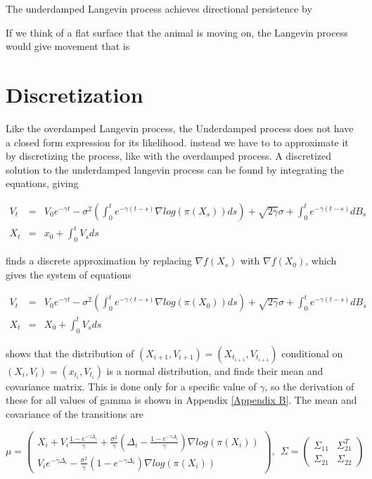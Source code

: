 The underdamped Langevin process achieves directional persistence by 

If we think of a flat surface that the animal is moving on, the Langevin process would give movement that is 


\section{Discretization}

Like the overdamped Langevin process, the Underdamped process does not have a closed form expression for its likelihood. instead we have to to approximate it by discretizing the process, like with the overdamped process. A discretized solution to the underdamped langevin process can be found by integrating the equations, giving


$$
\begin{array}{lcl} V_t & = & V_0 e^{-\gamma t}-\sigma^2(\int_0^{t} e^{-\gamma(t-s)}\nabla log(\pi(X_s))ds) + \sqrt{2\gamma}\sigma + \int_0^{t} e^{-\gamma(t-s)} dB_s \\
X_t & = & x_0 + \int_0^{t} V_s ds \end{array}
$$


\cite{cheng_underdamped_nodate} finds a discrete approximation by replacing $\nabla f(X_s)$ with $\nabla f(X_0)$, which gives the system of equations

$$
\begin{array}{lcl} V_t & = & V_0 e^{-\gamma t}-\sigma^2(\int_0^t e^{-\gamma(t-s)}\nabla log(\pi(X_0))ds) + \sqrt{2\gamma}\sigma + \int_0^t e^{-\gamma(t-s)} dB_s \\
X_t & = & X_0 + \int_0^t V_s ds \end{array}
$$

\cite{cheng_underdamped_nodate} shows that the distribution of $(X_{i+1}, V_{i+1}) = (X_{t_{i+1}}, V_{t_{i+1}})$ conditional on $(X_i, V_i) = (x_{t_i}, V_{t_i})$ is a normal distribution, and finds their mean and covariance matrix. This is done only for a specific value of $\gamma$, so the derivation of these for all values of gamma is shown in Appendix \ref{Appendix B}. The mean and covariance of the transitions are

$$
\mu = \begin{pmatrix}
    X_i + V_i \frac{1-e^{-\gamma \Delta_i}}{\gamma} + \frac{\sigma^2}{\gamma}(\Delta_i - \frac{1-e^{-\gamma \Delta_i}}{\gamma})\nabla log(\pi(X_i)) \\
    V_i e^{-\gamma \Delta_i} - \frac{\sigma^2}{\gamma}(1-e^{-\gamma \Delta_i}) \nabla log(\pi(X_i))
\end{pmatrix}, \ \ \Sigma = \begin{pmatrix}
    \Sigma_{11} & \Sigma_{21}^T \\ \Sigma_{21} & \Sigma_{22}
\end{pmatrix}
$$

